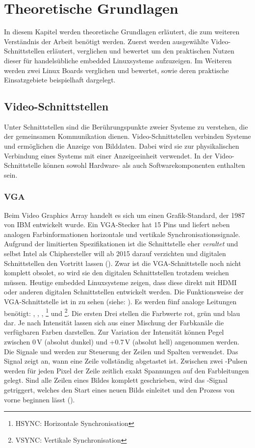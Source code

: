 \chapter{Theoretische Grundlagen}
\label{cha:Grundlagen}
In diesem Kapitel werden theoretische Grundlagen erläutert, die zum weiteren Verständnis der Arbeit benötigt werden. Zuerst werden ausgewählte Video-Schnittstellen erläutert, verglichen und bewertet um den praktischen Nutzen dieser für handelsübliche embedded Linuxsysteme aufzuzeigen. Im Weiteren werden zwei Linux Boards verglichen und bewertet, sowie deren praktische Einsatzgebiete beispielhaft dargelegt.

\section{Video-Schnittstellen}
Unter Schnittstellen sind die Berührungspunkte zweier Systeme zu verstehen, die der gemeinsamen Kommunikation dienen. Video-Schnittstellen verbinden Systeme und ermöglichen die Anzeige von Bilddaten. Dabei wird sie zur physikalischen Verbindung eines Systems mit einer Anzeigeeinheit verwendet. In der Video-Schnittstelle können sowohl Hardware- als auch Softwarekomponenten enthalten sein.
\subsection{VGA}
Beim Video Graphics Array handelt es sich um einen Grafik-Standard, der 1987 von IBM entwickelt wurde. Ein VGA-Stecker hat 15 Pins und liefert neben analogen Farbinformationen horizontale und vertikale Synchronisationssignale. Aufgrund der limitierten Spezifikationen ist die Schnittstelle eher \textit{veraltet} und selbst Intel als Chiphersteller will ab 2015 darauf verzichten und digitalen Schnittstellen den Vortritt lassen (\cite{Intel2010}). Zwar ist die VGA-Schnittstelle noch nicht komplett obsolet, so wird sie den digitalen Schnittstellen trotzdem weichen müssen. Heutige embedded Linuxsysteme zeigen, dass diese direkt mit HDMI oder anderen digitalen Schnittstellen entwickelt werden.
Die Funktionsweise der VGA-Schnittstelle ist in  zu sehen (siehe: \cite{Valcarce2011}). Es werden fünf analoge Leitungen benötigt: , , , \footnote{HSYNC: Horizontale Synchronisation} und \footnote{VSYNC: Vertikale Synchronisation}. Die ersten Drei stellen die Farbwerte rot, grün und blau dar. Je nach Intensität lassen sich aus einer Mischung der Farbkanäle die verfügbaren Farben darstellen. Zur Variation der Intensität können Pegel zwischen 0\,V (absolut dunkel) und +0.7\,V (absolut hell) angenommen werden. Die Signale  und  werden zur Steuerung der Zeilen und Spalten verwendet. Das Signal  zeigt an, wann eine Zeile vollständig abgetastet ist. Zwischen zwei -Pulsen werden für jeden Pixel der Zeile zeitlich exakt Spannungen auf den Farbleitungen gelegt. Sind alle Zeilen eines Bildes komplett geschrieben, wird das -Signal getriggert, welches den Start eines neuen Bilds einleitet und den Prozess von vorne beginnen lässt (\cite{Valcarce2011}).

